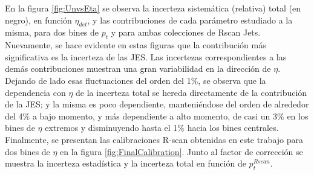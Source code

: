 En la figura \ref{fig:UnvsEta} se observa la incerteza sistemática (relativa) total (en negro), en función $\eta_{det}$, y las contribuciones de cada parámetro estudiado a la misma, para dos bines de $p_t$ y para ambas colecciones de Rscan Jets. Nuevamente, se hace evidente en estas figuras que la contribución más significativa es la incerteza de las JES. Las incertezas correspondientes a las demás contribuciones muestran una gran variabilidad en la dirección de $\eta$. Dejando de lado esas fluctuaciones del orden del 1$\%$, se observa que la dependencia con $\eta$ de la incerteza total se hereda directamente de la contribución de la JES; y la misma es poco dependiente, manteniéndose del orden de alrededor del 4$\%$ a bajo momento, y más dependiente a alto momento, de casi un 3$\%$ en los bines de $\eta$ extremos y disminuyendo hasta el 1$\%$ hacia los bines centrales.\\


Finalmente, se presentan las calibraciones R-scan obtenidas en este trabajo para dos bines de $\eta$ en la figura \ref{fig:FinalCalibration}. Junto al factor de corrección se muestra la incerteza estadística y la incerteza total en función de $p_t^{Rscan}$.



